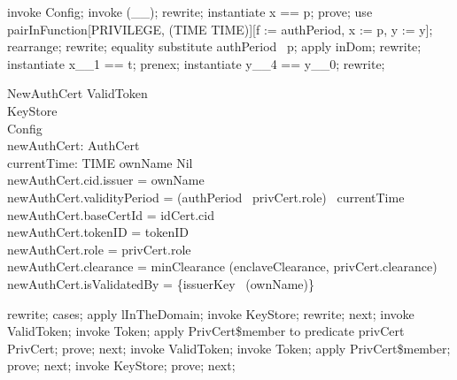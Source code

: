 \begin{zproof}[lConfigAuthPeriodTotalOnFirstArg]
invoke Config;
invoke (\_\fun \_);
rewrite;
instantiate x == p;
prove;
use pairInFunction[PRIVILEGE, \power  (TIME \cross  \power  TIME)][f := authPeriod, x := p, y := y];
rearrange;
rewrite;
equality substitute authPeriod~ p;
apply inDom;
rewrite;
instantiate x\_\_1 == t;
prenex;
instantiate y\_\_4 == y\_\_0;
rewrite;
\end{zproof}

\begin{schema}{NewAuthCert}
  ValidToken\\
  KeyStore\\
  Config\\
  newAuthCert: AuthCert\\
  currentTime: TIME
\where
  ownName \neq  Nil\\
  newAuthCert.cid.issuer = \The ownName\\
  newAuthCert.validityPeriod = (authPeriod~ privCert.role)~ currentTime\\
  newAuthCert.baseCertId = idCert.cid\\
  newAuthCert.tokenID = tokenID\\
  newAuthCert.role = privCert.role\\
  newAuthCert.clearance = minClearance (enclaveClearance, privCert.clearance)\\
  newAuthCert.isValidatedBy = \{issuerKey~ (\The ownName)\}
\end{schema}

\begin{zproof}
rewrite;
cases;
apply lInTheDomain;
invoke KeyStore;
rewrite;
next;
invoke ValidToken;
invoke Token;
apply PrivCert\$member to predicate privCert \in  PrivCert;
prove;
next;
invoke ValidToken;
invoke Token;
apply PrivCert\$member;
prove;
next;
invoke KeyStore;
prove;
next;
\end{zproof}


